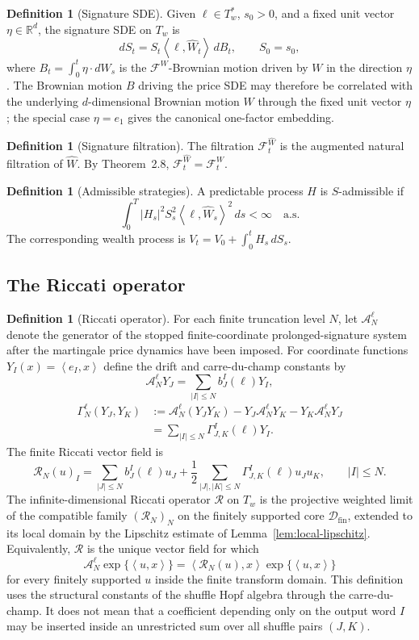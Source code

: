 \documentclass[11pt,oneside]{article}
\theoremstyle{plain}
\theoremstyle{definition}
\newtheorem{definition}[theorem]{Definition}
\theoremstyle{remark}
\newcommand{\R}{\mathbb{R}}
\newcommand{\Tw}{T_w}
\newcommand{\Tstarw}{T_w^\ast}
\newcommand{\cW}{\widehat W}
\newcommand{\FWh}{\mathcal F^{\widehat W}}
\newcommand{\FW}{\mathcal F^W}
\newcommand{\Rs}{\mathcal R}
\newcommand{\inner}[2]{\left\langle #1,#2\right\rangle}
\begin{document}
\begin{definition}[Signature SDE]
Given $\ell\in\Tstarw$, $s_0>0$, and a fixed unit vector $\eta\in\R^d$, the signature SDE on $\Tw$ is
\[
dS_t=S_t\inner{\ell}{\cW_t}\,dB_t,
\qquad S_0=s_0,
\]
where $B_t=\int_0^t\eta\cdot dW_s$ is the $\FW$-Brownian motion driven by $W$ in the direction $\eta$. The Brownian motion $B$ driving the price SDE may therefore be correlated with the underlying $d$-dimensional Brownian motion $W$ through the fixed unit vector $\eta$; the special case $\eta=e_1$ gives the canonical one-factor embedding.
\end{definition}

\begin{definition}[Signature filtration]
The filtration $\FWh_t$ is the augmented natural filtration of $\cW$. By Theorem~2.8, $\FWh_t=\FW_t$.
\end{definition}

\begin{definition}[Admissible strategies]\label{def:admissible-strategies}
A predictable process $H$ is $S$-admissible if
\[
\int_0^T |H_s|^2 S_s^2 \inner{\ell}{\cW_s}^2\,ds<\infty\quad\text{a.s.}
\]
The corresponding wealth process is $V_t=V_0+\int_0^t H_s\,dS_s$.
\end{definition}

\subsection{The Riccati operator}

\begin{definition}[Riccati operator]\label{def:riccati}
For each finite truncation level $N$, let $\mathcal A_N^\ell$ denote the generator of the stopped finite-coordinate prolonged-signature system after the martingale price dynamics have been imposed. For coordinate functions $Y_I(x)=\inner{e_I}{x}$ define the drift and carre-du-champ constants by
\[
\mathcal A_N^\ell Y_J=\sum_{|I|\leq N} b^I_J(\ell)Y_I,
\]
\[
\begin{aligned}
\Gamma_N^\ell(Y_J,Y_K)
&:=\mathcal A_N^\ell(Y_JY_K)-Y_J\mathcal A_N^\ell Y_K-Y_K\mathcal A_N^\ell Y_J \\
&=\sum_{|I|\leq N} \Gamma^I_{J,K}(\ell)Y_I .
\end{aligned}
\]
The finite Riccati vector field is
\[
\Rs_N(u)_I=\sum_{|J|\leq N} b^I_J(\ell)u_J
+\frac12\sum_{|J|,|K|\leq N}\Gamma^I_{J,K}(\ell)u_Ju_K,
\qquad |I|\leq N.
\]
The infinite-dimensional Riccati operator $\Rs$ on $\Tw$ is the projective weighted limit of the compatible family $(\Rs_N)_N$ on the finitely supported core $\mathcal D_{\mathrm{fin}}$, extended to its local domain by the Lipschitz estimate of Lemma~\ref{lem:local-lipschitz}. Equivalently, $\Rs$ is the unique vector field for which
\[
\mathcal A_N^\ell \exp\{\inner{u}{x}\}
=\inner{\Rs_N(u)}{x}\exp\{\inner{u}{x}\}
\]
for every finitely supported $u$ inside the finite transform domain. This definition uses the structural constants of the shuffle Hopf algebra through the carre-du-champ. It does not mean that a coefficient depending only on the output word $I$ may be inserted inside an unrestricted sum over all shuffle pairs $(J,K)$.
\end{definition}
\end{document}
